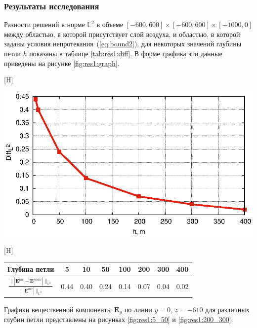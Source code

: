 \documentclass[a4paper,14pt]{article}
\makeatletter
\renewenvironment{figure}[1][\fps@figure]{
  \edef\@tempa{\noexpand\@float{figure}[#1]}
  \@tempa
  \addtocounter{foofigure}{1}
}{
  \end@float
}
\renewenvironment{table}[1][\fps@table]{
  \edef\@tempa{\noexpand\@float{table}[#1]}
  \@tempa
  \addtocounter{footable}{1}
}{
  \end@float
}
\makeatother
\begin{document}
\subsubsection{Результаты исследования}
Разности решений в норме $\mathbb{L}^2$ в объеме $[-600,600] \times [-600,600] \times [-1000,0]$ между областью, в которой присутствует слой воздуха, и областью, в которой заданы условия непротекания~(\ref{eq:bound2}), для некоторых значений глубины петли $h$ показаны в таблице \ref{tab:res1:diff}. В форме графика эти данные приведены на рисунке \ref{fig:res1:graph}.

\begin{figure}[H]
	\centering
	\includegraphics[scale=1]{research-1/presentation/presentation.eps}
	\caption{график изменения относительной разности решений при изменении глубины}
	\label{fig:res1:graph}
\end{figure}

\begin{table}[H]
	\caption{относительные разности решений}
	\label{tab:res1:diff}
	\begin{tabularx}{\textwidth}{|C{2.4}|C{0.8}|C{0.8}|C{0.8}|C{0.8}|C{0.8}|C{0.8}|C{0.8}|}
		\hline Глубина петли & 5 & 10 & 50 & 100 & 200 & 300 & 400 \\
		\hline $\displaystyle \frac{\| | \mathbf{E}^{air} - \mathbf{E}^{noair} | \|_{\mathbb{L}^2}}{\| | \mathbf{E}^{air} | \|_{\mathbb{L}^2}}$ & 0.44 & 0.40 & 0.24 & 0.14 & 0.07 & 0.04 & 0.02 \\
		\hline
	\end{tabularx}
\end{table}

Графики вещественной компоненты $\mathbf{E}_y$ по линии $y=0$, $z=-610$ для различных глубин петли представлены на рисунках \ref{fig:res1:5_50} и \ref{fig:res1:200_300}.
\end{document}
